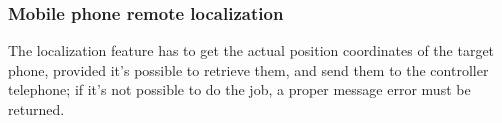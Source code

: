 \subsubsection{Mobile phone remote localization}
\small{The localization feature has to get the actual position coordinates of the target phone, provided it's possible to retrieve them, and send them to the controller telephone; if it's not possible to do the job, a proper message error must be returned.}